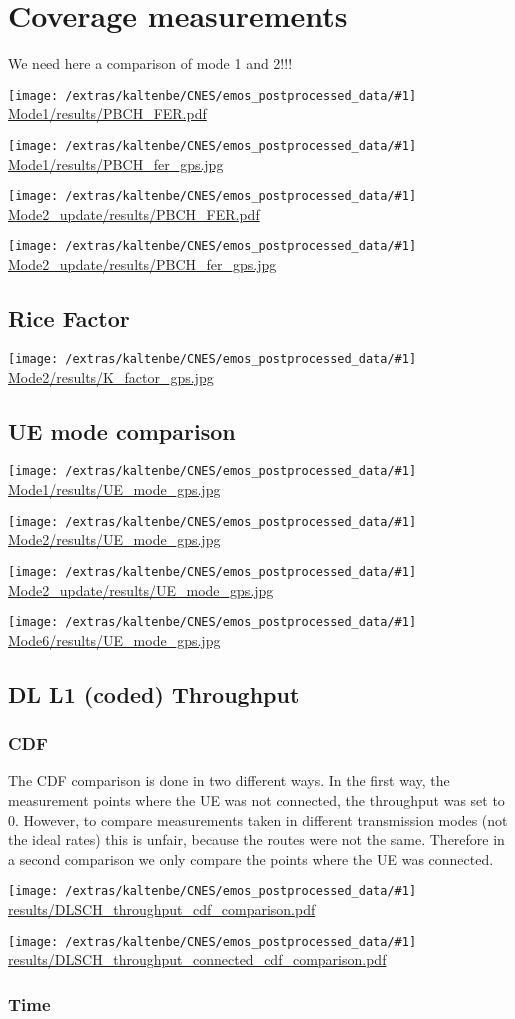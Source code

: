 \documentclass[a4paper,10pt]{article}
\newcommand{\printfile}[1]{
 \begin{minipage}{8cm}
  \centering
  \texttt{[image: /extras/kaltenbe/CNES/emos\_postprocessed\_data/\#1]}
  \url{#1}

 \end{minipage}
}
\begin{document}
\section{Coverage measurements}
We need here a comparison of mode 1 and 2!!!

\printfile{Mode1/results/PBCH_FER.pdf}
\printfile{Mode1/results/PBCH_fer_gps.jpg}

\printfile{Mode2_update/results/PBCH_FER.pdf}
\printfile{Mode2_update/results/PBCH_fer_gps.jpg}

\subsection{Rice Factor}

\printfile{Mode2/results/K_factor_gps.jpg}

\subsection{UE mode comparison}
\printfile{Mode1/results/UE_mode_gps.jpg}
\printfile{Mode2/results/UE_mode_gps.jpg}

\printfile{Mode2_update/results/UE_mode_gps.jpg}
\printfile{Mode6/results/UE_mode_gps.jpg}

\subsection{DL L1 (coded) Throughput}

\subsubsection{CDF}

The CDF comparison is done in two different ways. In the first way, the measurement points where the UE was not connected, the throughput was set to 0. However, to compare measurements taken in different transmission modes (not the ideal rates) this is unfair, because the routes were not the same. Therefore in a second comparison we only compare the points where the UE was connected.

\printfile{results/DLSCH_throughput_cdf_comparison.pdf}
\printfile{results/DLSCH_throughput_connected_cdf_comparison.pdf}

\subsubsection{Time}
\end{document}
